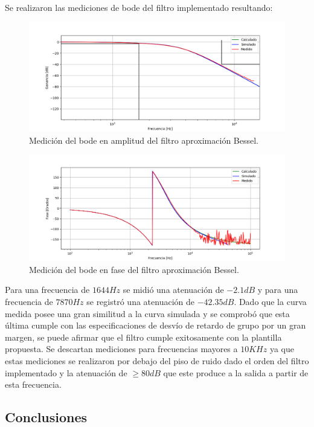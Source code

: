 Se realizaron las mediciones de bode del filtro implementado resultando:
\begin{figure}[H]
\centering
	\centering
	\includegraphics[width=\textwidth]{Imagenes-Ej1/bessel_hs_med.png}
	\caption{Medición del bode en amplitud del filtro aproximación Bessel.}
	\label{bes_bodeamp_med}
\end{figure}
\begin{figure}[H]
\centering
	\centering
	\includegraphics[width=\textwidth]{Imagenes-Ej1/bessel_hspha_med.png}
	\caption{Medición del bode en fase del filtro aproximación Bessel.}
	\label{bes_bodepha_med}
\end{figure}

Para una frecuencia de $1644Hz$ se midió una atenuación de $-2.1dB$ y para una frecuencia de $7870Hz$ se registró una atenuación de $-42.35dB$. Dado que la curva medida posee una gran similitud a la curva simulada y se comprobó que esta última cumple con las especificaciones de desvío de retardo de grupo por un gran margen, se puede afirmar que el filtro cumple exitosamente con la plantilla propuesta. Se descartan mediciones para frecuencias mayores a $10KHz$ ya que estas mediciones se realizaron por debajo del piso de ruido dado el orden del filtro implementado y la atenuación de $\geq 80dB$ que este produce a la salida a partir de esta frecuencia.

\subsection{Conclusiones}

